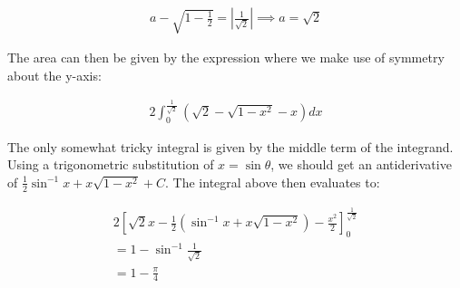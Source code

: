 \begin{enumerate}
\begin{enumerate}
	    \begin{align*}
	        a - \sqrt{1 - \frac{1}{2}} = \left|\frac{1}{\sqrt{2}}\right| \implies a = \sqrt{2}
	    \end{align*}
	    
	    The area can then be given by the expression where we make use of symmetry about the y-axis:
	    
	    \begin{align*}
	        2\int_0^\frac{1}{\sqrt{2}}\left(\sqrt{2} - \sqrt{1 - x^2} - x\right)dx
	    \end{align*}
	    
	    The only somewhat tricky integral is given by the middle term of the integrand. Using a trigonometric substitution of $x = \sin\theta$, we should get an antiderivative of $\frac{1}{2}\sin^{-1}x + x\sqrt{1-x^2} + C$. The integral above then evaluates to:
	    
	    \begin{align*}
	        2\left[\sqrt{2}x - \frac{1}{2}\left(\sin^{-1}x + x\sqrt{1-x^2}\right) - \frac{x^2}{2}\right]_0^\frac{1}{\sqrt{2}} \\ 
	        = 1 - \sin^{-1}\frac{1}{\sqrt{2}} \\ 
	        = 1 - \frac{\pi}{4}
	    \end{align*}
\end{enumerate}



    

    
    


\end{enumerate}
